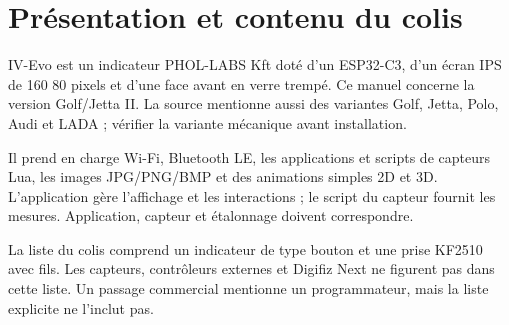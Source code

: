 \chapter{Présentation et contenu du colis}
IV-Evo est un indicateur PHOL-LABS Kft doté d'un ESP32-C3, d'un écran IPS de 160\,\texttimes\,80 pixels et d'une face avant en verre trempé. Ce manuel concerne la version Golf/Jetta II. La source mentionne aussi des variantes Golf, Jetta, Polo, Audi et LADA ; vérifier la variante mécanique avant installation.

Il prend en charge Wi-Fi, Bluetooth LE, les applications et scripts de capteurs Lua, les images JPG/PNG/BMP et des animations simples 2D et 3D. L'application gère l'affichage et les interactions ; le script du capteur fournit les mesures. Application, capteur et étalonnage doivent correspondre.

La liste du colis comprend un indicateur de type bouton et une prise KF2510 avec fils. Les capteurs, contrôleurs externes et Digifiz Next ne figurent pas dans cette liste. Un passage commercial mentionne un programmateur, mais la liste explicite ne l'inclut pas.
